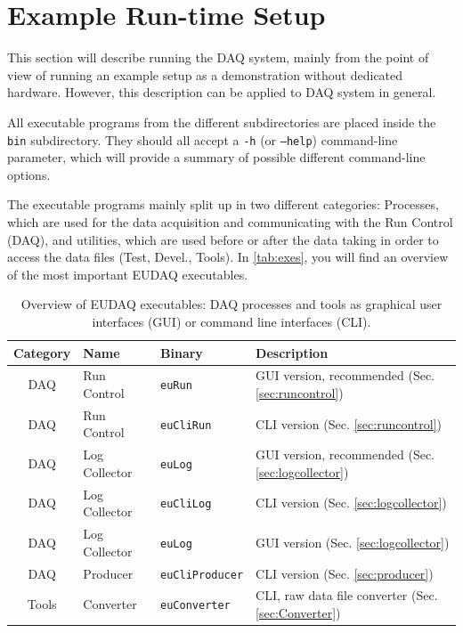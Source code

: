 \section{Example Run-time Setup}
This section will describe running the DAQ system, mainly from the point of view of running an example setup as a demonstration without dedicated hardware.
However, this description can be applied to DAQ system in general.

All executable programs from the different subdirectories are placed inside the \texttt{bin} subdirectory. They should all accept a \texttt{-h} (or \texttt{--help}) command-line parameter, which will provide a summary of possible different command-line options.

The executable programs mainly split up in two different categories: Processes, which are used for the data acquisition and communicating with the Run Control (DAQ), and utilities, which are used before or after the data taking in order to access the data files (Test, Devel., Tools).
In \autoref{tab:exes}, you will find an overview of the most important EUDAQ executables.

\begin{table}
\centering
\small
\begin{tabular}{ c | l | l | p{4cm}}
  \textbf{Category} & \textbf{Name} & \textbf{Binary}  & \textbf{Description}\\
  \hline			
  \hline			
  DAQ & Run Control & \texttt{euRun} & GUI version, recommended (Sec. \ref{sec:runcontrol}) \\
  DAQ & Run Control & \texttt{euCliRun} & CLI version (Sec. \ref{sec:runcontrol}) \\
  DAQ & Log Collector & \texttt{euLog} & GUI version, recommended (Sec. \ref{sec:logcollector}) \\
  DAQ & Log Collector & \texttt{euCliLog} & CLI version (Sec. \ref{sec:logcollector}) \\
  DAQ & Log Collector & \texttt{euLog} & GUI version (Sec. \ref{sec:logcollector}) \\
  DAQ & Producer & \texttt{euCliProducer} & CLI version (Sec. \ref{sec:producer}) \\
  \hline
  Tools & Converter & \texttt{euConverter} & CLI, raw data file converter (Sec. \ref{sec:Converter}) \\
\end{tabular}
\caption{Overview of EUDAQ executables: DAQ processes and tools as graphical user interfaces (GUI) or command line interfaces (CLI).}
\label{tab:exes}
\end{table}

